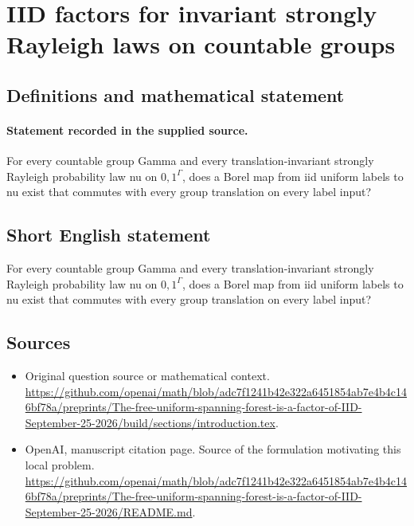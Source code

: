 \documentclass[11pt]{article}
\begin{document}
\section*{IID factors for invariant strongly Rayleigh laws on countable groups}\label{30007398}
\subsection{Definitions and mathematical statement}
\paragraph{Statement recorded in the supplied source.}
For every countable group Gamma and every translation-invariant strongly Rayleigh probability law nu on ${0,1}^\Gamma $, does a Borel map from iid uniform labels to nu exist that commutes with every group translation on every label input?
\subsection{Short English statement}
For every countable group Gamma and every translation-invariant strongly Rayleigh probability law nu on ${0,1}^\Gamma $, does a Borel map from iid uniform labels to nu exist that commutes with every group translation on every label input?
\subsection{Sources}
\begin{itemize}
\item[S1] Original question source or mathematical context.
\url{https://github.com/openai/math/blob/adc7f1241b42e322a6451854ab7e4b4c146bf78a/preprints/The-free-uniform-spanning-forest-is-a-factor-of-IID-September-25-2026/build/sections/introduction.tex}.
\item[S2] OpenAI, manuscript citation page. Source of the formulation motivating this local problem.
\url{https://github.com/openai/math/blob/adc7f1241b42e322a6451854ab7e4b4c146bf78a/preprints/The-free-uniform-spanning-forest-is-a-factor-of-IID-September-25-2026/README.md}.
\end{itemize}
\end{document}
